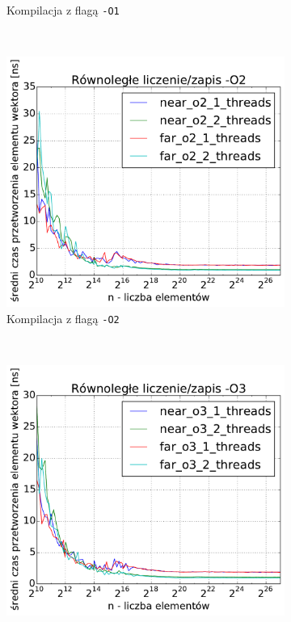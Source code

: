 \begin{figure}
\begin{subfigure}[c]{0.45\textwidth}
        \caption{Kompilacja z flagą \texttt{-O1}}
    \end{subfigure}
    \\
    \vspace{0.2cm}
    \begin{subfigure}[c]{0.45\textwidth}
        \centering
        \includegraphics[width=\textwidth]{images/benchs_xeon/parallel_count_1_2_O2}
        \caption{Kompilacja z flagą \texttt{-O2}}
    \end{subfigure}
    ~
    \begin{subfigure}[c]{0.45\textwidth}
        \centering
        \includegraphics[width=\textwidth]{images/benchs_xeon/parallel_count_1_2_O3}

\end{subfigure}
\end{figure}
